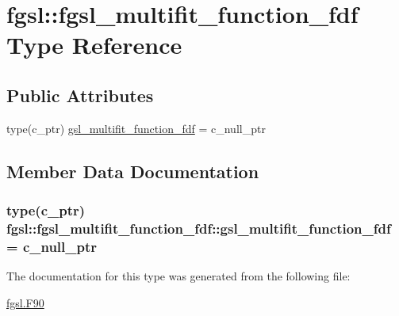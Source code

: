 \hypertarget{structfgsl_1_1fgsl__multifit__function__fdf}{\section{fgsl\-:\-:fgsl\-\_\-multifit\-\_\-function\-\_\-fdf Type Reference}
\label{structfgsl_1_1fgsl__multifit__function__fdf}
}
\subsection*{Public Attributes}
\begin{DoxyCompactItemize}
\item 
type(c\-\_\-ptr) \hyperlink{structfgsl_1_1fgsl__multifit__function__fdf_ab4186965275ddc26ff9a3ecd7641e625}{gsl\-\_\-multifit\-\_\-function\-\_\-fdf} = c\-\_\-null\-\_\-ptr
\end{DoxyCompactItemize}


\subsection{Member Data Documentation}
\hypertarget{structfgsl_1_1fgsl__multifit__function__fdf_ab4186965275ddc26ff9a3ecd7641e625}{
\subsubsection[{gsl\-\_\-multifit\-\_\-function\-\_\-fdf}]{\setlength{\rightskip}{0pt plus 5cm}type(c\-\_\-ptr) fgsl\-::fgsl\-\_\-multifit\-\_\-function\-\_\-fdf\-::gsl\-\_\-multifit\-\_\-function\-\_\-fdf = c\-\_\-null\-\_\-ptr}}\label{structfgsl_1_1fgsl__multifit__function__fdf_ab4186965275ddc26ff9a3ecd7641e625}


The documentation for this type was generated from the following file\-:\begin{DoxyCompactItemize}
\item 
\hyperlink{fgsl_8F90}{fgsl.\-F90}\end{DoxyCompactItemize}
